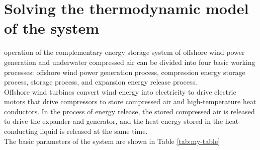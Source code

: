 \documentclass[journal,onecolumn]{IEEEtran}
\begin{document}
\section{Solving the thermodynamic model of the system}

 operation of the complementary energy storage system of offshore wind power generation and underwater compressed air can be divided into four basic working processes: offshore wind power generation process, compression energy storage process, storage process, and expansion energy release process.\\

Offshore wind turbines convert wind energy into electricity to drive electric motors that drive compressors to store compressed air and high-temperature heat conductors. In the process of energy release, the stored compressed air is released to drive the expander and generator, and the heat energy stored in the heat-conducting liquid is released at the same time. \\

The basic parameters of the system are shown in Table \ref{tab:my-table}
\end{document}

